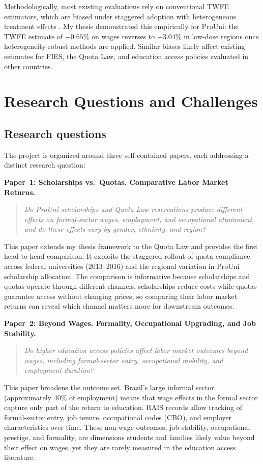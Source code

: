 \documentclass[a4paper,11pt]{article}
\begin{document}
Methodologically, most existing evaluations rely on conventional TWFE estimators, which are biased under staggered adoption with heterogeneous treatment effects \citep{goodmanbacon2021, dechaisemartin2020}. My thesis demonstrated this empirically for ProUni: the TWFE estimate of $-0.65\%$ on wages reverses to $+3.04\%$ in low-dose regions once heterogeneity-robust methods are applied. Similar biases likely affect existing estimates for FIES, the Quota Law, and education access policies evaluated in other countries.

\section{Research Questions and Challenges}

\subsection{Research questions}

The project is organized around three self-contained papers, each addressing a distinct research question:

\textbf{Paper~1: Scholarships vs.\ Quotas. Comparative Labor Market Returns.}
\begin{quote}
\textit{Do ProUni scholarships and Quota Law reservations produce different effects on formal-sector wages, employment, and occupational attainment, and do these effects vary by gender, ethnicity, and region?}
\end{quote}
This paper extends my thesis framework to the Quota Law and provides the first head-to-head comparison. It exploits the staggered rollout of quota compliance across federal universities (2013--2016) and the regional variation in ProUni scholarship allocation. The comparison is informative because scholarships and quotas operate through different channels, scholarships reduce costs while quotas guarantee access without changing prices, so comparing their labor market returns can reveal which channel matters more for downstream outcomes.

\textbf{Paper~2: Beyond Wages. Formality, Occupational Upgrading, and Job Stability.}
\begin{quote}
\textit{Do higher education access policies affect labor market outcomes beyond wages, including formal-sector entry, occupational mobility, and employment duration?}
\end{quote}
This paper broadens the outcome set. Brazil's large informal sector (approximately 40\% of employment) means that wage effects in the formal sector capture only part of the return to education. RAIS records allow tracking of formal-sector entry, job tenure, occupational codes (CBO), and employer characteristics over time. These non-wage outcomes, job stability, occupational prestige, and formality, are dimensions students and families likely value beyond their effect on wages, yet they are rarely measured in the education access literature.
\end{document}
